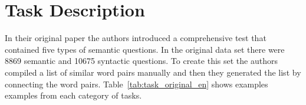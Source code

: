 








\section{Task Description}


In their original paper \cite{DBLP:journals/corr/abs-1301-3781} the authors
introduced a comprehensive test that contained five types of semantic
questions. In the original data set  there were 8869 semantic and 10675
syntactic questions. To create this set the authors compiled a list of
similar word pairs manually and then they generated the list by
connecting the word pairs. Table~\ref{tab:task_original_en} shows examples 
examples from each category of tasks. 

